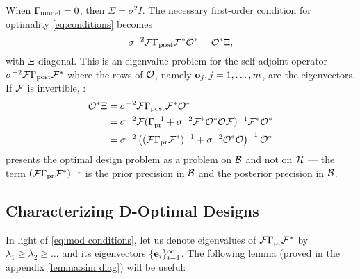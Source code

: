 \documentclass{amsart}
\numberwithin{equation}{section}
\begin{document}
\subsection{}\label{subsec:eigenproblem}
When $\Gamma_{\textup{model}} = 0$, then $\Sigma= \sigma^2I$. The necessary
first-order condition for optimality \eqref{eq:conditions} becomes
\begin{equation}\label{eq:eigenproblem}
  \sigma^{-2}\mathcal{F} \Gamma_{\textup{post}} \mathcal{F}^* \mathcal{O}^* = \mathcal{O}^* \Xi, 
\end{equation}
with $\Xi$ diagonal. This is an eigenvalue problem for the
self-adjoint operator $\sigma^{-2}\mathcal{F} \Gamma_{\textup{post}} \mathcal{F}^*$ where the rows
of $\mathcal{O}$, namely $\mathbf{o}_j,j=1,\dots, m$, are the
eigenvectors.  If $\mathcal{F}$ is invertible, :
\begin{align}\label{eq:mod conditions}
  \begin{split}
  \mathcal{O}^* \Xi &= \sigma^{-2}\mathcal{F} \Gamma_{\textup{post}} \mathcal{F}^* \mathcal{O}^*  \\
  &= \sigma^{-2} \mathcal{F}( \Gamma_{\textup{pr}}^{-1} + \sigma^{-2}  \mathcal{F}^* \mathcal{O}^* \mathcal{O} \mathcal{F} )^{-1} \mathcal{F}^* \mathcal{O}^* \\
  &= \sigma^{-2} \left ( (\mathcal{F}\Gamma_{\textup{pr}}\mathcal{F}^*)^{-1} + \sigma^{-2}  \mathcal{O}^* \mathcal{O} \right )^{-1} \mathcal{O}^*
  \end{split}
\end{align}  
 presents the optimal design problem as a
problem on $\mathcal{B}$ and not on $\mathcal{H}$ --- the term $(\mathcal{F} \Gamma_{\textup{pr}}
\mathcal{F}^*)^{-1}$ is the prior precision in $\mathcal{B}$ and  the posterior precision in
$\mathcal{B}$. 


\subsection{Characterizing D-Optimal Designs}\label{subsec:characterization}
In light of \eqref{eq:mod conditions}, let us denote eigenvalues of
$\mathcal{F} \Gamma_{\textup{pr}} \mathcal{F}^*$ by $\lambda_1 \geq \lambda_2 \geq \dots$ and its
eigenvectors $\{\mathbf{e}_i\}_{i=1}^{\infty}$. The following lemma (proved
in the appendix \ref{lemma:sim diag}) will be useful:
\end{document}
